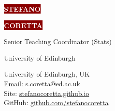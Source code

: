 \documentclass[9pt]{developercv} %
\begin{document}

\begin{minipage}[t]{0.5\textwidth} %
	\vspace{-\baselineskip} %

	\colorbox{darkred}{{\HUGE\textcolor{white}{\textbf{\MakeUppercase{Stefano}}}}} %

	\colorbox{darkred}{{\HUGE\textcolor{white}{\textbf{\MakeUppercase{Coretta}}}}} %

	\vspace{6pt}

	{\huge Senior Teaching Coordinator (Stats)} %

	University of Edinburgh
\end{minipage}
\begin{minipage}[t]{0.5\textwidth} %
	\vspace{-\baselineskip} %

  University of Edinburgh, UK\\
	Email: \href{mailto:s.coretta@ed.ac.uk}{s.coretta@ed.ac.uk}\\
  Site: \href{https://stefanocoretta.github.io}{stefanocoretta.github.io}\\
  GitHub: \href{https://github.com/stefanocoretta}{github.com/stefanocoretta}\\
\end{minipage}

\vspace{0.25cm}

\end{document}
